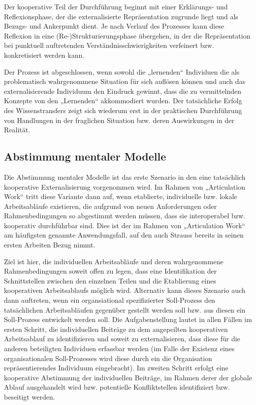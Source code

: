 Der kooperative Teil der Durchführung beginnt mit einer Erklärungs- und Reflexionsphase, der die externalisierte Repräsentation zugrunde liegt und als Bezugs- und Ankerpunkt dient. Je nach Verlauf des Prozesses kann diese Reflexion in eine (Re-)Strukturierungsphase übergehen, in der die Repräsentation bei punktuell auftretenden Verständnisschwierigkeiten verfeinert bzw. konkretisiert werden kann. 

Der Prozess ist abgeschlossen, wenn sowohl die „lernenden“ Individuen die als problematisch wahrgenommene Situation für sich auflösen können und auch das externalisierende Individuum den Eindruck gewinnt, dass die zu vermittelnden Konzepte von den „Lernenden“ akkommodiert wurden. Der tatsächliche Erfolg des Wissenstransfers zeigt sich wiederum erst in der praktischen Durchführung von Handlungen in der fraglichen Situation bzw. deren Auswirkungen in der Realität.


\subsection{Abstimmung mentaler Modelle} %
\label{sub:abstimmung_individueller_mentaler_modelle}

Die Abstimmung mentaler Modelle ist das erste Szenario in den eine tatsächlich kooperative Externalisierung vorgenommen wird. Im Rahmen von „Articulation Work“ tritt diese Variante dann auf, wenn etablierte, individuelle bzw. lokale Arbeitsabläufe existieren, die aufgrund von neuen Anforderungen oder Rahmenbedingungen so abgestimmt werden müssen, dass sie interoperabel bzw. kooperativ durchführbar sind. Dies ist der im Rahmen von „Articulation Work“ am häufigsten genannte Anwendungsfall, auf den auch Strauss bereits in seinen ersten Arbeiten Bezug nimmt.

Ziel ist hier, die individuellen Arbeitsabläufe und deren wahrgenommene Rahmenbedingungen soweit offen zu legen, dass eine Identifikation der Schnittstellen zwischen den einzelnen Teilen und die Etablierung eines kooperativen Arbeitsablaufs möglich wird. Alternativ kann dieses Szenario auch dann auftreten, wenn ein organsiational spezifizierter Soll-Prozess den tatsächlichen Arbeitsabläufen gegenüber gestellt werden soll bzw. aus diesen ein Soll-Prozess entwickelt werden soll. Die Aufgabenstellung lautet in allen Fällen im ersten Schritt, die individuellen Beiträge zu dem angepeilten kooperativen Arbeitsablauf zu identifizieren und soweit zu externalisieren, dass diese für die anderen beteiligten Individuen erfassbar werden (im Falle der Existenz eines organisationalen Soll-Prozesses wird diese durch ein die Organisation repräsentierendes Individuum eingebracht). Im zweiten Schritt erfolgt eine kooperative Abstimmung der individuellen Beiträge, im Rahmen derer der globale Ablauf ausgehandelt wird bzw. potentielle Konfliktstellen identifiziert bzw. beseitigt werden.

